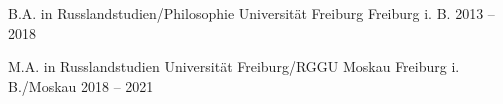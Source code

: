 
\begin{cventries}

  \cventry
  {B.A. in Russlandstudien/Philosophie} %
  {Universität Freiburg} %
  {Freiburg i. B.} %
  {2013 – 2018} %
  {}

  \cventry
  {M.A. in Russlandstudien} %
  {Universität Freiburg/RGGU Moskau} %
  {Freiburg i. B./Moskau} %
  {2018 – 2021} %
  {}

\end{cventries}
